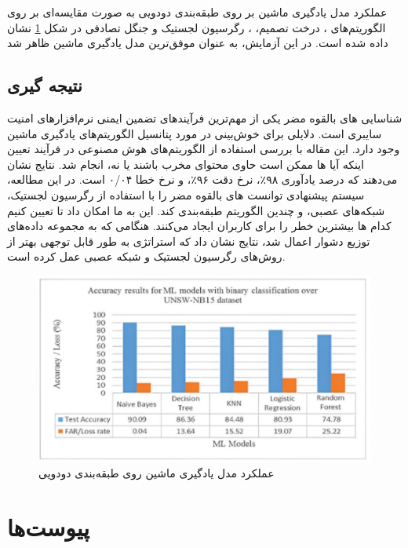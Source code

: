 \documentclass{CSICC2020}
\begin{document}
	عملکرد مدل یادگیری ماشین بر روی طبقه‌بندی دودویی به صورت مقایسه‌ای بر روی الگوریتم‌های ، درخت تصمیم، ، رگرسیون لجستیک و جنگل تصادفی در شکل \ref{fig:conclusion} نشان داده شده است. در این آزمایش،  به عنوان موفق‌ترین مدل یادگیری ماشین ظاهر شد
	
	
	\subsection{نتیجه گیری}
	شناسایی های بالقوه مضر یکی از مهم‌ترین فرآیندهای تضمین ایمنی نرم‌افزارهای امنیت سایبری است. دلایلی برای خوش‌بینی در مورد پتانسیل الگوریتم‌های یادگیری ماشین وجود دارد. این مقاله با بررسی استفاده از الگوریتم‌های هوش مصنوعی در فرآیند تعیین اینکه آیا ها ممکن است حاوی محتوای مخرب باشند یا نه، انجام شد. نتایج نشان می‌دهند که درصد یادآوری ۹۸٪، نرخ دقت ۹۶٪، و نرخ خطا ۰/۰۴ است. در این مطالعه، سیستم پیشنهادی توانست های بالقوه مضر را با استفاده از رگرسیون لجستیک، شبکه‌های عصبی، و چندین الگوریتم  طبقه‌بندی کند. این به ما امکان داد تا تعیین کنیم کدام ها بیشترین خطر را برای کاربران ایجاد می‌کنند. هنگامی که به مجموعه داده‌های توزیع دشوار اعمال شد، نتایج نشان داد که استراتژی  به طور قابل توجهی بهتر از روش‌های رگرسیون لجستیک و شبکه عصبی عمل کرده است.
	
		\begin{figure}
		\includegraphics[height=.57\linewidth]{Images/conclusion.pdf}
		\caption{
			عملکرد مدل یادگیری ماشین روی  طبقه‌بندی دودویی}
		\label{fig:conclusion}
	\end{figure}
	
	\section*{پیوست‌ها}
	
\end{document}
